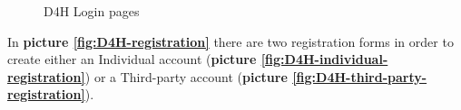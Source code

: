 \begin{figure}[H]
  \centering
  
  \caption{D4H Login pages}
  \label{fig:D4H-login-pages}
  
\end{figure}


In \textbf{picture \ref{fig:D4H-registration}} there are two registration forms in order to create either an Individual account (\textbf{picture \ref{fig:D4H-individual-registration}}) or a Third-party account (\textbf{picture \ref{fig:D4H-third-party-registration}}).


